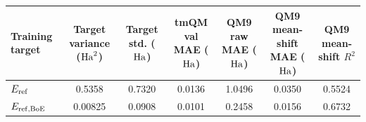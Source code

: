 \begin{tabular}{lcccccc}
\toprule
Training target &
Target variance (\({\rm Ha}^2\)) &
Target std. (\({\rm Ha}\)) &
tmQM val MAE (\({\rm Ha}\)) &
QM9 raw MAE (\({\rm Ha}\)) &
QM9 mean-shift MAE (\({\rm Ha}\)) &
QM9 mean-shift \(R^2\) \\
\midrule
\(E_{\rm ref}\) & 0.5358 & 0.7320 & 0.0136 & 1.0496 & 0.0350 & 0.5524 \\
\(E_{\rm ref,BoE}\) & 0.00825 & 0.0908 & 0.0101 & 0.2458 & 0.0156 & 0.6732 \\
\bottomrule
\end{tabular}
